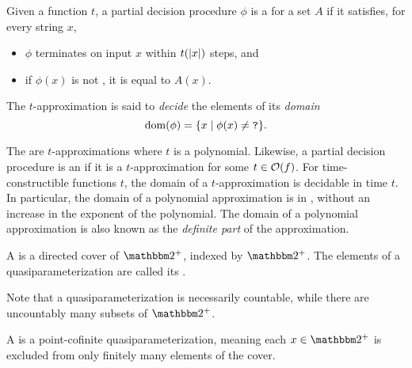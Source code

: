 \begin{definition}
  Given a function $t$, a partial decision procedure $\phi$ is a  for a set $A$ if it satisfies, for every string $x$,
  \begin{itemize}
  \item $\phi$ terminates on input $x$ within $t({\lvert x\rvert})$ steps, and
  \item if $\phi(x)$ is not , it is equal to $A(x)$.
  \end{itemize}
  The $t$-approximation is said to \emph{decide} the elements of its \emph{domain}
  \begin{equation*}
    \operatorname{dom}(\phi) = \{x \;{|}\; \phi(x) \neq \textnormal{\texttt{?}}\}.
  \end{equation*}
\end{definition}
The  \parencite{ko1981completeness,balcazar1985bi-immune} are $t$-approximations where $t$ is a polynomial.
Likewise, a partial decision procedure is an  if it is a $t$-approximation for some $t \in \operatorname{\mathcal{O}}(f)$.
For time-constructible functions $t$, the domain of a $t$-approximation is decidable in time $t$.
In particular, the domain of a polynomial approximation is in , without an increase in the exponent of the polynomial.
The domain of a polynomial approximation is also known as the \emph{definite part} of the approximation.

\begin{definition}
  A  is a directed cover of $\binary^+$, indexed by $\binary^+$.
  The elements of a quasiparameterization are called its .
\end{definition}

Note that a quasiparameterization is necessarily countable, while there are uncountably many subsets of $\binary^+$.

\begin{definition}
  A  is a point-cofinite quasiparameterization, meaning each $x \in \binary^+$ is excluded from only finitely many elements of the cover.
\end{definition}

